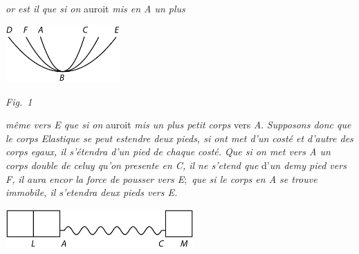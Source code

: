 \textit{or est il que si on} auroit \textit{mis en A un plus} %
%
\pend
 \vspace{1.5em}
  \centerline{\includegraphics[width=0.33\textwidth]{gesamttex/edit_VIII,3/images/LH_35_09_16_004_d1.pdf}}%
  \vspace{0.5em}
  \centerline{\lbrack\textit{Fig.~1}\rbrack}%
  \label{LH_35_09_16_004r_Fig.1}%
\newpage
\pstart
\noindent
 \textit{même vers \textit{E} que si on} auroit \textit{mis un plus petit corps} vers \textit{A}.
\textit{Supposons donc
que le corps Elastique\protect{}
se peut estendre deux pieds,\protect{}
si ont met d'un costé et d'autre des corps egaux,
il s'étendra d'un pied\protect{} de chaque costé.
Que si on met vers \textit{A} un corps double de celuy
qu'on}
%
\textit{presente en C,
il ne s'etend que} d'\textit{un demy pied vers F,}
%
\textit{il aura encor la force de pousser vers E}\lbrack;\rbrack\
\textit{que si le corps en A se trouve immobile,
il s'etendra deux pieds vers E.}
\pend%
  \vspace{2.0em}
  \centerline{\includegraphics[width=0.54\textwidth]{gesamttex/edit_VIII,3/images/LH_35_09_16_004_d2.pdf}}%
